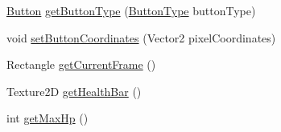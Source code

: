 \begin{DoxyCompactItemize}
\item 
\hyperlink{class_model_1_1_button}{Button} \hyperlink{class_model_1_1_unit_module_1_1_mage_a996253aeeb97c7a5d64ad81c03adf0f0}{get\+Button\+Type} (\hyperlink{namespace_model_ac76b3489c9d704f49912608bd36cd0e7}{Button\+Type} button\+Type)
\item 
void \hyperlink{class_model_1_1_unit_module_1_1_mage_a2cbdb537e8039e19367b2d9905847e1b}{set\+Button\+Coordinates} (Vector2 pixel\+Coordinates)
\item 
Rectangle \hyperlink{class_model_1_1_unit_module_1_1_mage_a66ef058e38d7220bc65604504eb25bce}{get\+Current\+Frame} ()
\item 
Texture2D \hyperlink{class_model_1_1_unit_module_1_1_mage_af816450e9803b56a1bf97bb9f04c2008}{get\+Health\+Bar} ()
\item 
int \hyperlink{class_model_1_1_unit_module_1_1_mage_a3b3a869faa3d4014175b79c87d18c865}{get\+Max\+Hp} ()
\end{DoxyCompactItemize}
